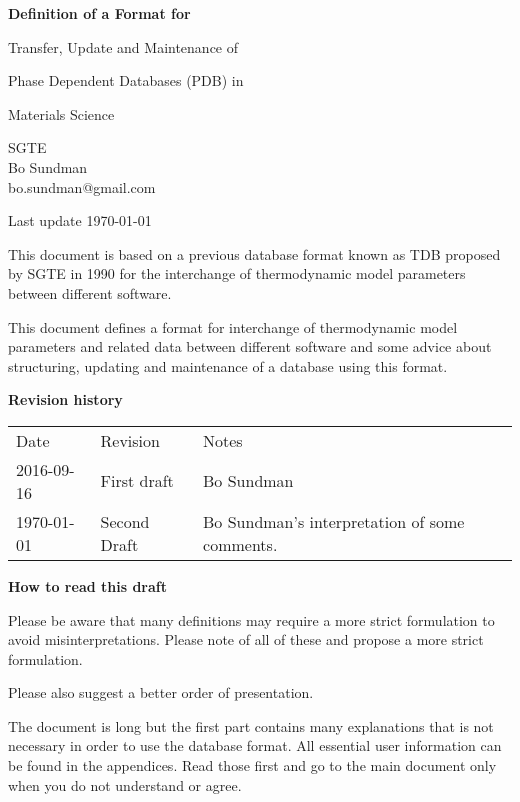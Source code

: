 \documentclass[12pt]{article}
\begin{document}
\begin{center}

\vspace{30mm}

{\Large \bf Definition of a Format for

Transfer, Update and Maintenance of

Phase Dependent Databases (PDB) in

Materials Science

}

\vspace{20mm}

SGTE\\
Bo Sundman\\
bo.sundman@gmail.com

\vspace{120mm}

Last update \today
\end{center}

\newpage

This document is based on a previous database format known as TDB
proposed by SGTE in 1990 for the interchange of thermodynamic model
parameters between different software.

This document defines a format for interchange of thermodynamic model
parameters and related data between different software and some advice
about structuring, updating and maintenance of a database using this
format.

\vspace{5mm}
{\bf Revision history}

\begin{tabular}{lll}
Date       & Revision    &  Notes \\
2016-09-16 & First draft & Bo Sundman\\
\today   & Second Draft & Bo Sundman's interpretation of some comments.
\end{tabular}

\vspace{5mm}

{\bf How to read this draft}

\bigskip

Please be aware that many definitions may require a more strict
formulation to avoid misinterpretations.  Please note of all of these
and propose a more strict formulation.

Please also suggest a better order of presentation.

The document is long but the first part contains many explanations
that is not necessary in order to use the database format.  All
essential user information can be found in the appendices.  Read those
first and go to the main document only when you do not understand or
agree.
\end{document}
